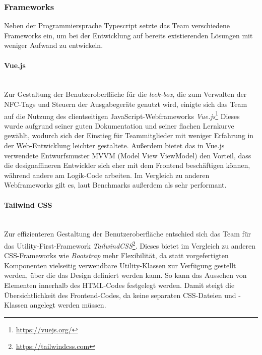 \documentclass[10pt, a4paper]{article}
\begin{document}
\subsubsection{Frameworks}
Neben der Programmiersprache Typescript setzte das Team verschiedene Frameworks ein, um bei der Entwicklung auf bereits existierenden Lösungen mit weniger Aufwand zu entwickeln.

\paragraph*{Vue.js} $~$ \\
Zur Gestaltung der Benutzeroberfläche für die \textit{leek-box}, die zum Verwalten der NFC-Tags und Steuern der Ausgabegeräte genutzt wird, einigte sich das Team auf die Nutzung des
clientseitigen JavaScript-Webframeworks \textit{Vue.js}\footnote{\raggedright\url{https://vuejs.org/}}
Dieses wurde aufgrund seiner guten Dokumentation und seiner flachen Lernkurve gewählt, wodurch sich der Einstieg für Teammitglieder mit weniger Erfahrung in der Web-Entwicklung leichter gestaltete.
Außerdem bietet das in Vue.js verwendete Entwurfsmuster MVVM (Model View ViewModel) den Vorteil, dass die designaffineren Entwickler sich eher mit dem Frontend beschäftigen können,
während andere am Logik-Code arbeiten. Im Vergleich zu anderen Webframeworks gilt es, laut Benchmarks außerdem als sehr performant.\cite{Vue_Performance}

\paragraph*{Tailwind CSS} $~$ \\
Zur effizienteren Gestaltung der Benutzeroberfläche entschied sich das Team für das Utility-First-Framework \textit{TailwindCSS}\footnote{\raggedright\url{https://tailwindcss.com}}.
Dieses bietet im Vergleich zu anderen CSS-Frameworks wie \textit{Bootstrap} mehr Flexibilität, da statt vorgefertigten Komponenten vielseitig verwendbare Utility-Klassen zur Verfügung gestellt werden,
über die das Design definiert werden kann. So kann das Aussehen von Elementen innerhalb des HTML-Codes festgelegt werden.
Damit steigt die Übersichtlichkeit des Frontend-Codes, da keine separaten CSS-Dateien und -Klassen angelegt werden müssen.
\cite{Tailwind_Vorteile}
\end{document}
